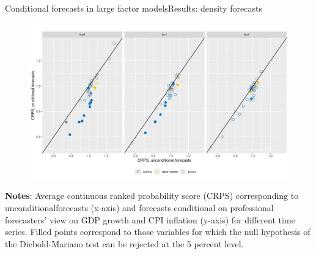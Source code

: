 \documentclass[xcolor=svgnames, 10pt, aspectratio=169]{beamer}
\begin{document}
\begin{frame}{Conditional forecasts in large factor models}{Results: density forecasts}
    \begin{figure}
        \includegraphics[scale = 0.4]{fig_eval_crps.pdf}  \vspace{0.1cm} \\
    \end{figure}

    \begin{adjustbox}{minipage=0.8\textwidth,center}
        {\tiny \textbf{Notes}: Average continuous ranked probability score (CRPS) corresponding to unconditionalforecasts (x-axis) and forecasts conditional on professional forecasters’ view on GDP growth and CPI inflation (y-axis) for different time series. Filled points correspond to those variables for which the null hypothesis of the Diebold-Mariano test can be rejected at the 5 percent level.}\par
\end{adjustbox} 
\end{frame}
\end{document}
